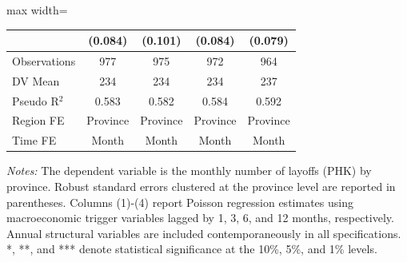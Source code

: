 \begin{table}[H]
\begin{adjustbox}{max width=\textwidth}
\begin{tabular}{l*{4}{c}}
            &     (0.084)         &     (0.101)         &     (0.084)         &     (0.079)         \\
\midrule
Observations&         977         &         975         &         972         &         964         \\
DV Mean     &         234         &         234         &         234         &         237         \\
Pseudo R$^2$&       0.583         &       0.582         &       0.584         &       0.592         \\
Region FE   &    Province         &    Province         &    Province         &    Province         \\
Time FE     &       Month         &       Month         &       Month         &       Month         \\
\bottomrule
\end{tabular}
\end{adjustbox}
\begin{tablenotes}
\footnotesize
\item \textit{Notes:} The dependent variable is the monthly number of layoffs (PHK) by province. Robust standard errors clustered at the province level are reported in parentheses. Columns (1)-(4) report Poisson regression estimates using macroeconomic trigger variables lagged by 1, 3, 6, and 12 months, respectively. Annual structural variables are included contemporaneously in all specifications. *, **, and *** denote statistical significance at the 10\%, 5\%, and 1\% levels.
\end{tablenotes}
\end{table}
